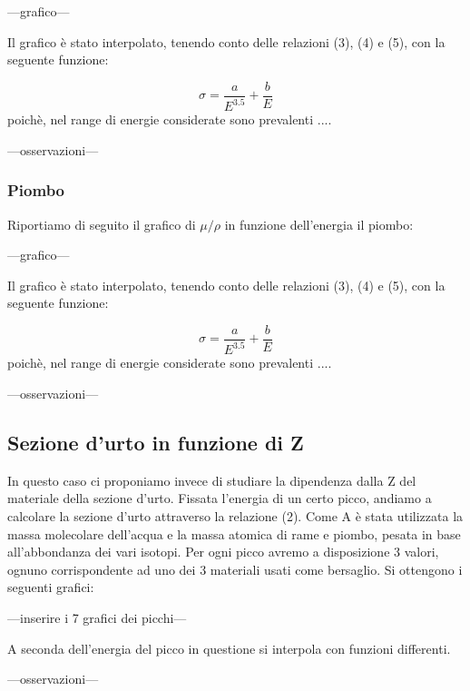 \documentclass[a4paper,10pt]{article}
\begin{document}
---grafico---

Il grafico è stato interpolato, tenendo conto delle relazioni (3), (4) e (5), con la seguente funzione:

\begin{equation}
	\sigma = \frac{a}{E^{3.5}} + \frac{b}{E}
\end{equation}
poichè, nel range di energie considerate sono prevalenti .... 

---osservazioni---
\subsubsection{Piombo}
Riportiamo di seguito il grafico di $\mu/\rho$ in funzione dell'energia il piombo:

---grafico---

Il grafico è stato interpolato, tenendo conto delle relazioni (3), (4) e (5), con la seguente funzione:

\begin{equation}
	\sigma = \frac{a}{E^{3.5}} + \frac{b}{E}
\end{equation}
poichè, nel range di energie considerate sono prevalenti .... 

---osservazioni---

\subsection{Sezione d'urto in funzione di Z}
In questo caso ci proponiamo invece di studiare la dipendenza dalla Z del materiale della sezione d'urto. Fissata l'energia di un certo picco, andiamo a calcolare la sezione d'urto attraverso la relazione (2). Come A è stata utilizzata la massa molecolare dell'acqua e la massa atomica di rame e piombo, pesata in base all'abbondanza dei vari isotopi. Per ogni picco avremo a disposizione 3 valori, ognuno corrispondente ad uno dei 3 materiali usati come bersaglio. Si ottengono i seguenti grafici:

---inserire i 7 grafici dei picchi---

A seconda dell'energia del picco in questione si interpola con funzioni differenti.

---osservazioni---
\end{document}
